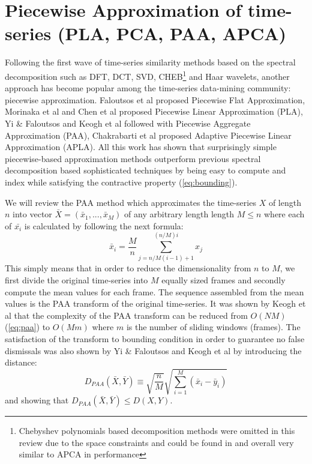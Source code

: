 \section{Piecewise Approximation of time-series (PLA, PCA, PAA, APCA)}
Following the first wave of time-series similarity methods based on the spectral decomposition such as DFT, DCT, SVD, CHEB\footnote{Chebyshev polynomials based decomposition methods were omitted in this review due to the space constraints and could be found in \cite{citeulike:2753031} and overall very similar to APCA in performance}
and Haar wavelets, another approach has become popular among the time-series data-mining community: piecewise approximation. Faloutsos et al \cite{citeulike:4344279} proposed Piecewise Flat Approximation, Morinaka et al \cite{citeulike:4295248} and Chen et al \cite{citeulike:4165220} proposed Piecewise Linear Approximation (PLA), Yi \& Faloutsos \cite{citeulike:2946589} and Keogh et al \cite{citeulike:3000416} followed with Piecewise Aggregate Approximation (PAA), Chakrabarti et al \cite{citeulike:1736140} proposed Adaptive Piecewise Linear Approximation (APLA). All this work has shown that surprisingly simple piecewise-based approximation methods outperform previous spectral decomposition based sophisticated techniques by being easy to compute and index while satisfying the contractive property (\ref{eq:bounding}).

We will review the PAA method which approximates the time-series $X$ of length $n$ into vector $\bar{X} = ( \bar{x}_{1}, ..., \bar{x}_{M} )$ of any arbitrary length length $M \leq n$ where each of $\bar{x_{i}}$ is calculated by following the next formula:
\begin{equation}
\bar{x}_{i} = \frac{M}{n} \sum_{j=n/M(i-1)+1}^{(n/M)i} x_{j}
\label{eq:paa}
\end{equation}
This simply means that in order to reduce the dimensionality from $n$ to $M$, we first divide the original time-series into $M$ equally sized frames and secondly compute the mean values for each frame. The sequence assembled from the mean values is the PAA transform of the original time-series. It was shown by Keogh et al that the complexity of the PAA transform can be reduced from $O(NM)$ (\ref{eq:paa}) to $O(Mm)$ where $m$ is the number of sliding windows (frames). The satisfaction of the transform to bounding condition in order to guarantee no false dismissals was
also shown by Yi \& Faloutsos and Keogh et al by introducing the distance:
\begin{equation}
D_{PAA}(\bar{X}, \bar{Y}) \equiv \sqrt{\frac{n}{M}} \sqrt{ \sum_{i=1}^{M} 
\left(  \bar{x}_{i} - \bar{y}_{i} \right)}
\label{eq:paa_distnace}
\end{equation}
and showing that $D_{PAA}(\bar{X}, \bar{Y}) \leq D(X,Y)$.

